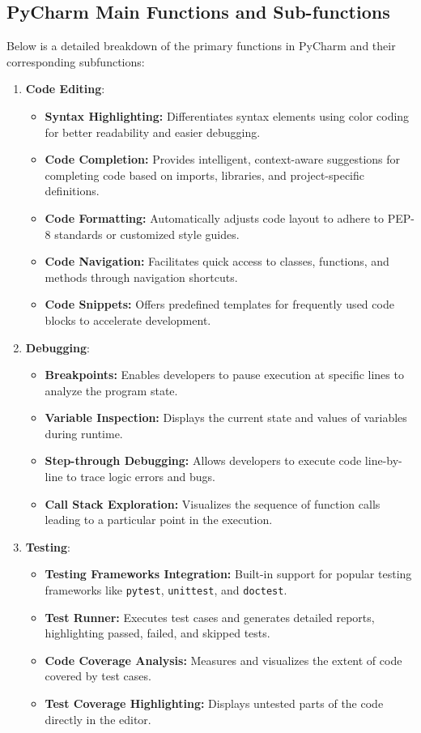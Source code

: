 \subsection{PyCharm Main Functions and Sub-functions}

Below is a detailed breakdown of the primary functions in PyCharm and their corresponding subfunctions:

\begin{enumerate}
	\item \textbf{Code Editing}:
	\begin{itemize}
		\item \textbf{Syntax Highlighting:} Differentiates syntax elements using color coding for better readability and easier debugging.
		\item \textbf{Code Completion:} Provides intelligent, context-aware suggestions for completing code based on imports, libraries, and project-specific definitions.
		\item \textbf{Code Formatting:} Automatically adjusts code layout to adhere to PEP-8 standards or customized style guides.
		\item \textbf{Code Navigation:} Facilitates quick access to classes, functions, and methods through navigation shortcuts.
		\item \textbf{Code Snippets:} Offers predefined templates for frequently used code blocks to accelerate development.
	\end{itemize}
	
	\item \textbf{Debugging}:
	\begin{itemize}
		\item \textbf{Breakpoints:} Enables developers to pause execution at specific lines to analyze the program state.
		\item \textbf{Variable Inspection:} Displays the current state and values of variables during runtime.
		\item \textbf{Step-through Debugging:} Allows developers to execute code line-by-line to trace logic errors and bugs.
		\item \textbf{Call Stack Exploration:} Visualizes the sequence of function calls leading to a particular point in the execution.
	\end{itemize}
	
	\item \textbf{Testing}:
	\begin{itemize}
		\item \textbf{Testing Frameworks Integration:} Built-in support for popular testing frameworks like \texttt{pytest}, \texttt{unittest}, and \texttt{doctest}.
		\item \textbf{Test Runner:} Executes test cases and generates detailed reports, highlighting passed, failed, and skipped tests.
		\item \textbf{Code Coverage Analysis:} Measures and visualizes the extent of code covered by test cases.
		\item \textbf{Test Coverage Highlighting:} Displays untested parts of the code directly in the editor.
	\end{itemize}
	

\end{enumerate}
